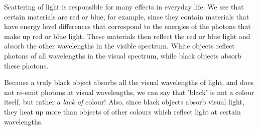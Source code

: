 Scattering of light is responsible for many effects in everyday life.
We see that certain materials are red or blue, for example, since they contain materials that have energy level differences that correspond to the energies of the photons that make up red or blue light.  These materials then reflect the red or blue light and absorb the other wavelengths in the visible spectrum.  White objects reflect photons of all wavelengths in the visual spectrum, while black objects absorb these photons.

\begin{IFact}{Because a truly black object absorbs all the visual wavelengths of light, and does not re-emit photons at visual wavelengths, we can say that 'black' is not a colour itself, but rather a \textit{lack of} colour! Also, since black objects absorb visual light, they heat up more than objects of other colours which reflect light at certain wavelengths.}
\end{IFact}

